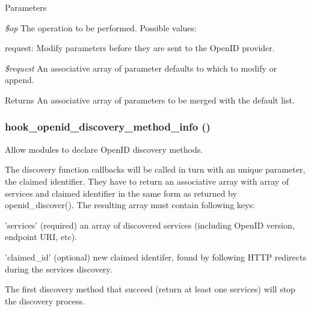 \begin{DoxyParams}{Parameters}
\item[{\em \$op}]The operation to be performed. Possible values:
\begin{DoxyItemize}
\item request: Modify parameters before they are sent to the OpenID provider. 
\end{DoxyItemize}\item[{\em \$request}]An associative array of parameter defaults to which to modify or append. \end{DoxyParams}
\begin{DoxyReturn}{Returns}
An associative array of parameters to be merged with the default list. 
\end{DoxyReturn}
\hypertarget{group__hooks_gaec6cbfdd913d8ba670c991b87bbf9676}{
\subsubsection[{hook\_\-openid\_\-discovery\_\-method\_\-info}]{\setlength{\rightskip}{0pt plus 5cm}hook\_\-openid\_\-discovery\_\-method\_\-info ()}}
\label{group__hooks_gaec6cbfdd913d8ba670c991b87bbf9676}
Allow modules to declare OpenID discovery methods.

The discovery function callbacks will be called in turn with an unique parameter, the claimed identifier. They have to return an associative array with array of services and claimed identifier in the same form as returned by openid\_\-discover(). The resulting array must contain following keys:
\begin{DoxyItemize}
\item 'services' (required) an array of discovered services (including OpenID version, endpoint URI, etc).
\item 'claimed\_\-id' (optional) new claimed identifer, found by following HTTP redirects during the services discovery.
\end{DoxyItemize}

The first discovery method that succeed (return at least one services) will stop the discovery process.

